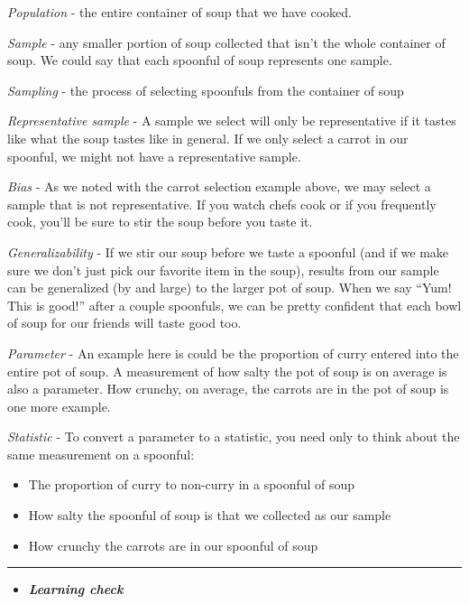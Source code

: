 \documentclass[]{tufte-book}
\let\oldrule=\rule
\renewcommand{\rule}[1]{\oldrule{\linewidth}}
\providecommand{\tightlist}{%
  \setlength{\itemsep}{0pt}\setlength{\parskip}{0pt}}
\newenvironment{rmdblock}[1]
  {\begin{shaded*}
  \begin{itemize}
  \renewcommand{\labelitemi}{
    \raisebox{-.7\height}[0pt][0pt]{
    }
  }
  \item
  }
  {
  \end{itemize}
  \end{shaded*}
  }
\newenvironment{learncheck}
  {\begin{rmdblock}{warning}}
  {\end{rmdblock}}
\begin{document}
\emph{Population} - the entire container of soup that we have cooked.

\emph{Sample} - any smaller portion of soup collected that isn't the
whole container of soup. We could say that each spoonful of soup
represents one sample.

\emph{Sampling} - the process of selecting spoonfuls from the container
of soup

\emph{Representative sample} - A sample we select will only be
representative if it tastes like what the soup tastes like in general.
If we only select a carrot in our spoonful, we might not have a
representative sample.

\emph{Bias} - As we noted with the carrot selection example above, we
may select a sample that is not representative. If you watch chefs cook
or if you frequently cook, you'll be sure to stir the soup before you
taste it.

\emph{Generalizability} - If we stir our soup before we taste a spoonful
(and if we make sure we don't just pick our favorite item in the soup),
results from our sample can be generalized (by and large) to the larger
pot of soup. When we say ``Yum! This is good!'' after a couple
spoonfuls, we can be pretty confident that each bowl of soup for our
friends will taste good too.

\emph{Parameter} - An example here is could be the proportion of curry
entered into the entire pot of soup. A measurement of how salty the pot
of soup is on average is also a parameter. How crunchy, on average, the
carrots are in the pot of soup is one more example.

\emph{Statistic} - To convert a parameter to a statistic, you need only
to think about the same measurement on a spoonful:

\begin{itemize}
\tightlist
\item
  The proportion of curry to non-curry in a spoonful of soup
\item
  How salty the spoonful of soup is that we collected as our sample
\item
  How crunchy the carrots are in our spoonful of soup
\end{itemize}

\begin{center}\rule{0.5\linewidth}{\linethickness}\end{center}

\begin{learncheck}
\textbf{\emph{Learning check}}
\end{learncheck}
\end{document}
